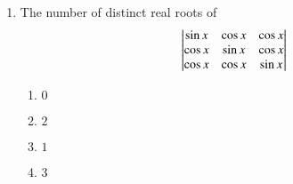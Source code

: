 \begin{enumerate}[label=\thesubsection.\arabic*,ref=\thesubsection.\theenumi]

    \item The number of distinct real roots of
    \begin{align*}
	    \begin{vmatrix}
		\sin{x}&\cos{x}&\cos{x}\\
    		\cos{x}&\sin{x}&\cos{x}\\
		\cos{x}&\cos{x}&\sin{x}\end{vmatrix}
    \end{align*}

        \hfill{}
        \begin{enumerate}
                \item $0$
                \item $2$
                \item $1$
                \item $3$
        \end{enumerate}


\end{enumerate}
